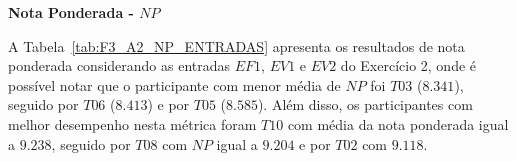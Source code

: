 
\textbf{Nota Ponderada - $NP$}

A Tabela~\ref{tab:F3_A2_NP_ENTRADAS} apresenta os resultados de nota ponderada considerando as entradas $EF1$, $EV1$ e $EV2$ do Exercício 2, onde é possível notar que o participante com menor média de $NP$ foi $T03$ ($8.341$), seguido por $T06$ ($8.413$) e por $T05$ ($8.585$). Além disso, os participantes com melhor desempenho nesta métrica foram $T10$ com média da nota ponderada igual a $9.238$, seguido por $T08$ com $NP$ igual a $9.204$ e por $T02$ com $9.118$.

